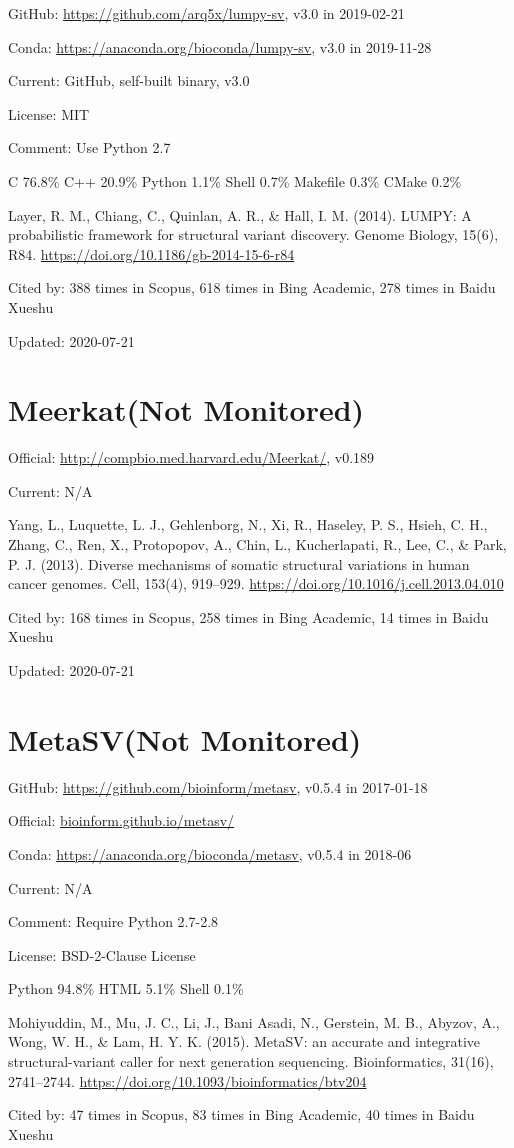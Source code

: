 \documentclass[]{article}
\newcommand{\nm}{{\color{red}(Not Monitored)}}
\newcommand{\cb}[3]{\par Cited by: {\color{blue}\Huge #1} times in Scopus, {\color{blue}\Huge #2} times in Bing Academic, {\color{blue}\Huge #3} times in Baidu Xueshu}
\begin{document}
GitHub: \url{https://github.com/arq5x/lumpy-sv}, v3.0 in 2019-02-21

Conda: \url{https://anaconda.org/bioconda/lumpy-sv}, v3.0 in 2019-11-28

Current: GitHub, self-built binary, v3.0

License: MIT

Comment: Use Python 2.7

C 76.8\% C++ 20.9\% Python 1.1\% Shell 0.7\% Makefile 0.3\% CMake 0.2\%

Layer, R. M., Chiang, C., Quinlan, A. R., \& Hall, I. M. (2014). LUMPY: A probabilistic framework for structural variant discovery. Genome Biology, 15(6), R84. \url{https://doi.org/10.1186/gb-2014-15-6-r84} \cb{388}{618}{278}

Updated: 2020-07-21

\section{Meerkat\nm}

Official: \url{http://compbio.med.harvard.edu/Meerkat/}, v0.189

Current: N/A

Yang, L., Luquette, L. J., Gehlenborg, N., Xi, R., Haseley, P. S., Hsieh, C. H., Zhang, C., Ren, X., Protopopov, A., Chin, L., Kucherlapati, R., Lee, C., \& Park, P. J. (2013). Diverse mechanisms of somatic structural variations in human cancer genomes. Cell, 153(4), 919–929. \url{https://doi.org/10.1016/j.cell.2013.04.010}\cb{168}{258}{14}

Updated: 2020-07-21

\section{MetaSV\nm}

GitHub: \url{https://github.com/bioinform/metasv}, v0.5.4 in 2017-01-18

Official: \url{bioinform.github.io/metasv/}

Conda: \url{https://anaconda.org/bioconda/metasv}, v0.5.4 in 2018-06

Current: N/A

Comment: Require Python 2.7-2.8

License: BSD-2-Clause License

Python 94.8\% HTML 5.1\% Shell 0.1\%

Mohiyuddin, M., Mu, J. C., Li, J., Bani Asadi, N., Gerstein, M. B., Abyzov, A., Wong, W. H., \& Lam, H. Y. K. (2015). MetaSV: an accurate and integrative structural-variant caller for next generation sequencing. Bioinformatics, 31(16), 2741–2744. \url{https://doi.org/10.1093/bioinformatics/btv204}\cb{47}{83}{40}
\end{document}

